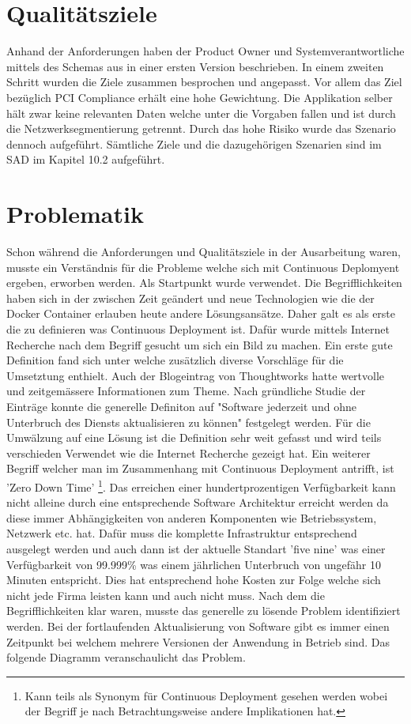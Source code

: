 \section{Qualitätsziele}

Anhand der Anforderungen haben der Product Owner und Systemverantwortliche mittels des Schemas aus \cite[p.305-311]{esa} in einer ersten Version beschrieben. In einem zweiten Schritt wurden die Ziele zusammen besprochen und angepasst. Vor allem das Ziel bezüglich PCI Compliance erhält eine hohe Gewichtung. Die Applikation selber hält zwar keine relevanten Daten welche unter die Vorgaben fallen und ist durch die Netzwerksegmentierung getrennt. Durch das hohe Risiko wurde das Szenario dennoch aufgeführt. Sämtliche Ziele und die dazugehörigen Szenarien sind im SAD im Kapitel 10.2 aufgeführt.

\section{Problematik}

Schon während die Anforderungen und Qualitätsziele in der Ausarbeitung waren, musste ein Verständnis für die Probleme welche sich mit Continuous Deplomyent ergeben, erworben werden. Als Startpunkt wurde \cite{cd} verwendet. Die Begrifflichkeiten haben sich in der zwischen Zeit geändert und neue Technologien wie die der Docker Container erlauben heute andere Lösungsansätze. Daher galt es als erste die zu definieren was Continuous Deployment ist. Dafür wurde mittels Internet Recherche nach dem Begriff gesucht um sich ein Bild zu machen. Ein erste gute Definition fand sich unter \cite{atlassiancd} welche zusätzlich diverse Vorschläge für die Umsetztung enthielt. Auch der Blogeintrag von Thoughtworks \cite{thoughtcd} hatte wertvolle und zeitgemässere Informationen zum Theme. Nach gründliche Studie der Einträge konnte die generelle Definiton auf "Software jederzeit und ohne Unterbruch des Diensts aktualisieren zu können" festgelegt werden. Für die Umwälzung auf eine Lösung ist die Definition sehr weit gefasst und wird teils verschieden Verwendet wie die Internet Recherche gezeigt hat. Ein weiterer Begriff welcher man im Zusammenhang mit Continuous Deployment antrifft, ist 'Zero Down Time' \footnote{Kann teils als Synonym für Continuous Deployment gesehen werden wobei der Begriff je nach Betrachtungsweise andere Implikationen hat.}. Das erreichen einer hundertprozentigen Verfügbarkeit kann nicht alleine durch eine entsprechende Software Architektur erreicht werden da diese immer Abhängigkeiten von anderen Komponenten wie Betriebssystem, Netzwerk etc. hat. Dafür muss die komplette Infrastruktur entsprechend ausgelegt werden und auch dann ist der aktuelle Standart 'five nine' was einer Verfügbarkeit von 99.999\% was einem jährlichen Unterbruch von ungefähr 10 Minuten entspricht. Dies hat entsprechend hohe Kosten zur Folge welche sich nicht jede Firma leisten kann und auch nicht muss.\newline
Nach dem die Begrifflichkeiten klar waren, musste das generelle zu lösende Problem identifiziert werden. Bei der fortlaufenden Aktualisierung von Software gibt es immer einen Zeitpunkt bei welchem mehrere Versionen der Anwendung in Betrieb sind. Das folgende Diagramm veranschaulicht das Problem.

